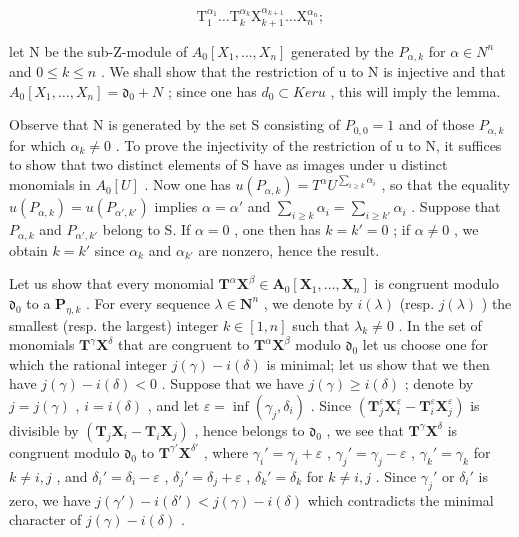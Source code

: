 \[
\mathrm{T} _ {1} ^ {\alpha_ {1}} \dots \mathrm{T} _ {k} ^ {\alpha_ {k}} \mathrm{X} _ {k + 1} ^ {\alpha_ {k + 1}} \dots \mathrm{X} _ {n} ^ {\alpha_ {n}};
\]

let N be the sub-Z-module of \(A_{0}[X_{1}, \ldots, X_{n}]\) generated by the \(P_{\alpha,k}\) for \(\alpha \in N^{n}\) and \(0 \leqslant k \leqslant n\) . We shall show that the restriction of u to N is injective and that \(A_{0}[X_{1}, \ldots, X_{n}] = \mathfrak{d}_{0} + N\) ; since one has \(d_{0} \subset Ker u\) , this will imply the lemma.

Observe that N is generated by the set S consisting of \(P_{0,0} = 1\) and of those \(P_{\alpha,k}\) for which \(\alpha_k \neq 0\) . To prove the injectivity of the restriction of u to N, it suffices to show that two distinct elements of S have as images under u distinct monomials in \(A_0[U]\) . Now one has \(u(P_{\alpha,k}) = T^\alpha U^{\sum_{i \geq k} \alpha_i}\) , so that the equality \(u(P_{\alpha,k}) = u(P_{\alpha',k'})\) implies \(\alpha = \alpha'\) and \(\sum_{i \geq k} \alpha_i = \sum_{i \geq k'} \alpha_i\) . Suppose that \(P_{\alpha,k}\) and \(P_{\alpha',k'}\) belong to S. If \(\alpha = 0\) , one then has \(k = k' = 0\) ; if \(\alpha \neq 0\) , we obtain \(k = k'\) since \(\alpha_k\) and \(\alpha_{k'}\) are nonzero, hence the result.

Let us show that every monomial \(\mathbf{T}^{\alpha}\mathbf{X}^{\beta}\in\mathbf{A}_{0}[\mathbf{X}_{1},..., \mathbf{X}_{n}]\) is congruent modulo \(\mathfrak{d}_{0}\) to a \(\mathbf{P}_{\eta,k}\) . For every sequence \(\lambda\in\mathbf{N}^{n}\) , we denote by \(i(\lambda)\) (resp. \(j(\lambda)\) ) the smallest (resp. the largest) integer \(k\in[1,n]\) such that \(\lambda_{k}\neq0\) . In the set of monomials \(\mathbf{T}^{\gamma}\mathbf{X}^{\delta}\) that are congruent to \(\mathbf{T}^{\alpha}\mathbf{X}^{\beta}\) modulo \(\mathfrak{d}_{0}\) let us choose one for which the rational integer \(j(\gamma)-i(\delta)\) is minimal; let us show that we then have \(j(\gamma)-i(\delta)<0\) . Suppose that we have \(j(\gamma)\geqslant i(\delta)\) ; denote by \(j=j(\gamma)\) , \(i=i(\delta)\) , and let \(\varepsilon=\inf(\gamma_{j},\delta_{i})\) . Since \((\mathbf{T}_{j}^{\varepsilon}\mathbf{X}_{i}^{\varepsilon}-\mathbf{T}_{i}^{\varepsilon}\mathbf{X}_{j}^{\varepsilon})\) is divisible by \((\mathbf{T}_{j}\mathbf{X}_{i}-\mathbf{T}_{i}\mathbf{X}_{j})\) , hence belongs to \(\mathfrak{d}_{0}\) , we see that \(\mathbf{T}^{\gamma}\mathbf{X}^{\delta}\) is congruent modulo \(\mathfrak{d}_{0}\) to \(\mathbf{T}^{\gamma'}\mathbf{X}^{\delta'}\) , where \(\gamma_{i}'=\gamma_{i}+\varepsilon\) , \(\gamma_{j}'=\gamma_{j}-\varepsilon\) , \(\gamma_{k}'=\gamma_{k}\) for \(k\neq i,j\) , and \(\delta_{i}'=\delta_{i}-\varepsilon\) , \(\delta_{j}'=\delta_{j}+\varepsilon\) , \(\delta_{k}'=\delta_{k}\) for \(k\neq i,j\) . Since \(\gamma_{j}'\) or \(\delta_{i}'\) is zero, we have \(j(\gamma')-i(\delta')<j(\gamma)-i(\delta)\) which contradicts the minimal character of \(j(\gamma)-i(\delta)\) .


